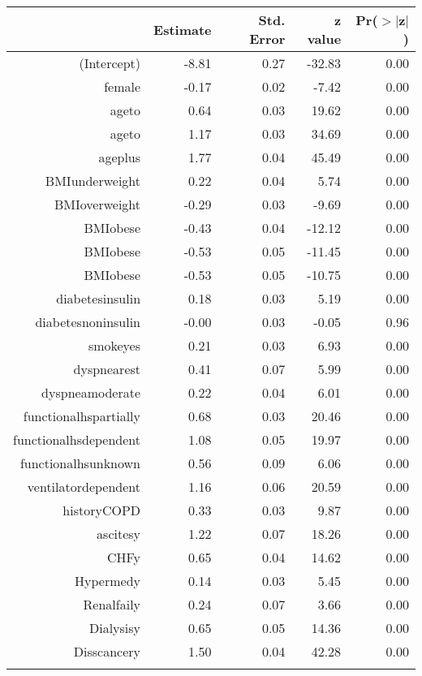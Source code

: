 \bigskip\bigskip
\centering
\begin{tabular}{rrrrr}
  \hline
 & Estimate & Std. Error & z value & Pr($>$$|$z$|$) \\ 
  \hline
(Intercept) & -8.81 & 0.27 & -32.83 & 0.00 \\ 
  female & -0.17 & 0.02 & -7.42 & 0.00 \\ 
  age\-65\-to\-74 & 0.64 & 0.03 & 19.62 & 0.00 \\ 
  age\-75\-to\-84 & 1.17 & 0.03 & 34.69 & 0.00 \\ 
  age\-85\-plus & 1.77 & 0.04 & 45.49 & 0.00 \\ 
  BMI\-underweight & 0.22 & 0.04 & 5.74 & 0.00 \\ 
  BMI\-overweight & -0.29 & 0.03 & -9.69 & 0.00 \\ 
  BMI\-obese\-1 & -0.43 & 0.04 & -12.12 & 0.00 \\ 
  BMI\-obese\-2 & -0.53 & 0.05 & -11.45 & 0.00 \\ 
  BMI\-obese\-3 & -0.53 & 0.05 & -10.75 & 0.00 \\ 
  diabetes\-insulin & 0.18 & 0.03 & 5.19 & 0.00 \\ 
  diabetes\-noninsulin & -0.00 & 0.03 & -0.05 & 0.96 \\ 
  smoke\-yes & 0.21 & 0.03 & 6.93 & 0.00 \\ 
  dyspnea\-rest & 0.41 & 0.07 & 5.99 & 0.00 \\ 
  dyspnea\-moderate & 0.22 & 0.04 & 6.01 & 0.00 \\ 
  functional\-hs\-partially & 0.68 & 0.03 & 20.46 & 0.00 \\ 
  functional\-hs\-dependent & 1.08 & 0.05 & 19.97 & 0.00 \\ 
  functional\-hs\-unknown & 0.56 & 0.09 & 6.06 & 0.00 \\ 
  ventilator\-dependent & 1.16 & 0.06 & 20.59 & 0.00 \\ 
  history\-COPD & 0.33 & 0.03 & 9.87 & 0.00 \\ 
  ascites\-y & 1.22 & 0.07 & 18.26 & 0.00 \\ 
  CHF\-y & 0.65 & 0.04 & 14.62 & 0.00 \\ 
  Hyper\-med\-y & 0.14 & 0.03 & 5.45 & 0.00 \\ 
  Renal\-fail\-y & 0.24 & 0.07 & 3.66 & 0.00 \\ 
  Dialysis\-y & 0.65 & 0.05 & 14.36 & 0.00 \\ 
  Diss\-cancer\-y & 1.50 & 0.04 & 42.28 & 0.00 \\ 
$$
\end{tabular}
